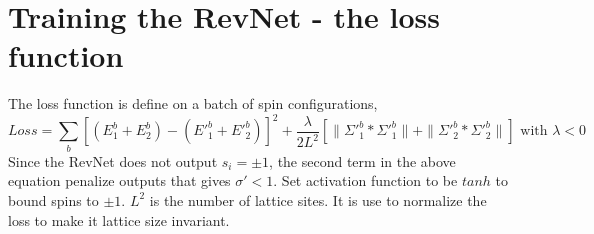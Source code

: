 \documentclass{article}
\begin{document}
\section{Training the RevNet - the loss function}
The loss function is define on a batch of spin configurations,
\begin{equation}
Loss = \sum_b [(E^b_{1}+E^b_{2}) - ({E'}^b_{1}+{E'}^b_{2})]^2 + 
      \frac{\lambda}{2 L^2} \left[ \| {\Sigma'}^b_1 *{\Sigma'}^b_1 \| +
                     \| {\Sigma'}^b_2 *{\Sigma'}^b_2 \| \right]
\mbox{ with }\lambda<0
\end{equation}
Since the RevNet does not output $s_i = \pm 1$, the second term in the above
equation penalize outputs that gives $\sigma'<1$.
Set activation function to be $tanh$ to bound spins to $\pm 1$.
$L^2$ is the number of lattice sites. It is use to normalize the loss to make it
lattice size invariant.
\end{document}
